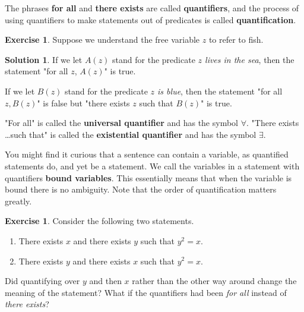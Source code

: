\documentclass[a4paper, 11pt]{report}
\theoremstyle{plain}
\theoremstyle{definition}
\newtheorem{exrc}[thm]{Exercise}
\newtheorem*{sltn}{Solution}
\begin{document}
The phrases \textbf{for all} and \textbf{there
exists} are called
\textbf{quantifiers}, and the process of using
quantifiers to make statements out of predicates is called
\textbf{quantification}.


\begin{exrc}
  Suppose we understand the free variable $z$ to refer to fish.
\end{exrc}

\begin{sltn}
If we let $A(z)$ stand for the predicate \textit{$z$ lives in the sea},
then the statement "for all $z$, $A(z)$" is true.

If we let $B(z)$ stand for the predicate \textit{$z$ is blue}, then the statement
"for all $z, B(z)$" is false but "there exists $z$ such that $B(z)$" is true.
\end{sltn}

"For all" is called the \textbf{universal quantifier} and has the symbol $\forall$\index{$\forall$}.  "There exists \ldots such that"
is called the \textbf{existential quantifier}
and has the symbol $\exists$.\index{$\exists$}

You might find it curious that a sentence can contain a variable, as quantified
statements do, and yet be a statement. We call the variables in a statement
with quantifiers \textbf{bound variables}. This
essentially means that when the variable is bound there is no ambiguity.
Note that the order of quantification matters greatly.

\begin{exrc}
  Consider the following two statements.
  \begin{enumerate}
    \item There exists $x$ and there exists $y$ such that $y^2 = x$.
    \item There exists $y$ and there exists $x$ such that $y^2 = x$.
  \end{enumerate}
  Did quantifying over $y$ and then $x$ rather than the other way around change
  the meaning of the statement? What if the quantifiers had been \textit{for
  all} instead of \textit{there exists}?
\end{exrc}
\end{document}
